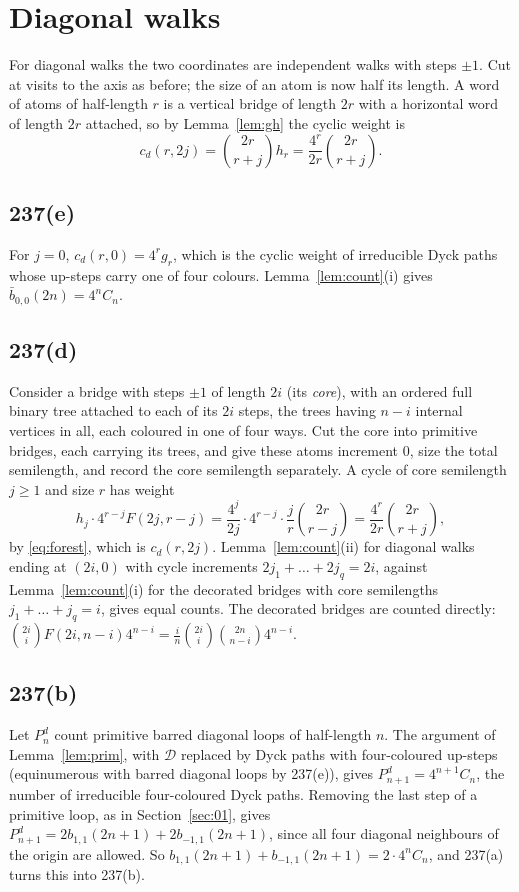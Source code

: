 \documentclass[11pt]{amsart}
\theoremstyle{definition}
\theoremstyle{remark}
\newcommand{\bbar}{\bar b}
\begin{document}
\section{Diagonal walks}\label{sec:diag}

For diagonal walks the two coordinates are independent walks with steps $\pm1$. Cut at visits to the axis as before;
the size of an atom is now half its length. A word of atoms of half-length $r$ is a vertical bridge of length $2r$ with
a horizontal word of length $2r$ attached, so by Lemma~\ref{lem:gh} the cyclic weight is
\begin{equation}\label{eq:cd}
  c_d(r,2j)=\binom{2r}{r+j}h_r=\frac{4^r}{2r}\binom{2r}{r+j}.
\end{equation}

\subsection*{237(e)} For $j=0$, $c_d(r,0)=4^rg_r$, which is the cyclic weight of irreducible Dyck paths whose up-steps
carry one of four colours. Lemma~\ref{lem:count}(i) gives $\bbar_{0,0}(2n)=4^nC_n$.

\subsection*{237(d)} Consider a bridge with steps $\pm1$ of length $2i$ (its \emph{core}), with an ordered full binary
tree attached to each of its $2i$ steps, the trees having $n-i$ internal vertices in all, each coloured in one of four
ways. Cut the core into primitive bridges, each carrying its trees, and give these atoms increment $0$, size the total
semilength, and record the core semilength separately. A cycle of core semilength $j\ge1$ and size $r$ has weight
\[
  h_j\cdot4^{r-j}F(2j,r-j)=\frac{4^j}{2j}\cdot4^{r-j}\cdot\frac jr\binom{2r}{r-j}=\frac{4^r}{2r}\binom{2r}{r+j},
\]
by \eqref{eq:forest}, which is $c_d(r,2j)$. Lemma~\ref{lem:count}(ii) for diagonal walks ending at $(2i,0)$ with
cycle increments $2j_1+\dots+2j_q=2i$, against Lemma~\ref{lem:count}(i) for the decorated bridges with core semilengths
$j_1+\dots+j_q=i$, gives equal counts. The decorated bridges are counted directly:
$\binom{2i}iF(2i,n-i)4^{n-i}=\frac in\binom{2i}i\binom{2n}{n-i}4^{n-i}$.

\subsection*{237(b)} Let $P^d_n$ count primitive barred diagonal loops of half-length $n$. The argument of
Lemma~\ref{lem:prim}, with $\mathcal D$ replaced by Dyck paths with four-coloured up-steps (equinumerous with barred
diagonal loops by 237(e)), gives $P^d_{n+1}=4^{n+1}C_n$, the number of irreducible four-coloured Dyck paths. Removing
the last step of a primitive loop, as in Section~\ref{sec:01}, gives $P^d_{n+1}=2b_{1,1}(2n+1)+2b_{-1,1}(2n+1)$, since
all four diagonal neighbours of the origin are allowed. So $b_{1,1}(2n+1)+b_{-1,1}(2n+1)=2\cdot4^nC_n$, and 237(a)
turns this into 237(b).
\end{document}
